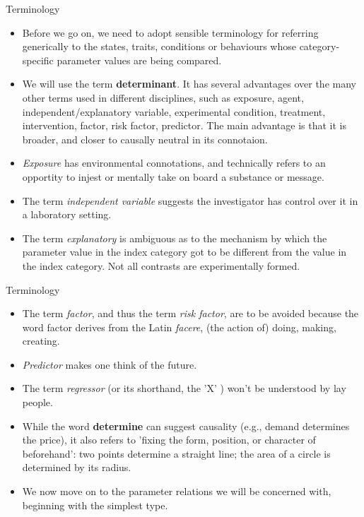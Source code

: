 \documentclass[10pt]{beamer}\usepackage[]{graphicx}\usepackage[]{color}
\begin{document}
\begin{frame}{Terminology}
\begin{itemize}
	\item Before we go on, we need to adopt sensible terminology for referring generically to the states, traits, conditions or behaviours  whose category-specific parameter values are being compared. \pause 
	
	\item We will use the term  \textbf{determinant}. It has several advantages over the many other terms used in different disciplines, such as exposure, agent, independent/explanatory variable, experimental condition, treatment, intervention, factor, risk factor, predictor. The main advantage is that it is broader, and closer to causally neutral in its connotaion. \pause 
	
	\item  \textit{Exposure} has environmental connotations, and technically refers to an opportity to injest or mentally take on board a substance or message.  
	\pause 
	\item The term \textit{independent variable} suggests the investigator has control over it in a laboratory setting. 
	\pause 
	\item The term \textit{explanatory} is  ambiguous as to the mechanism by which the parameter value in the index category got to be different from the value in the index category. Not all contrasts are experimentally formed. 

\end{itemize}
\end{frame}


\begin{frame}{Terminology}
	\begin{itemize}
		\item The term \textit{factor}, and thus the term \textit{risk factor}, are to be avoided because the word factor derives from the Latin \textit{facere}, (the action of) doing, making, creating. 
		\pause 		
		\item \textit{Predictor} makes one think of the future. 
		
		\pause 
		\item The term \textit{regressor} (or its shorthand, the 'X' ) won't be understood by lay people.
		
				\pause 
		\item While the word \textbf{determine} can suggest causality (e.g., demand determines the price), it also refers to 'fixing the form, position, or character of beforehand': two points determine a straight line; the area of a circle is determined by its radius.
		
				\pause 
		\item We now move on to the parameter relations we will be concerned with, beginning with the simplest type.
	\end{itemize}
\end{frame}
\end{document}
